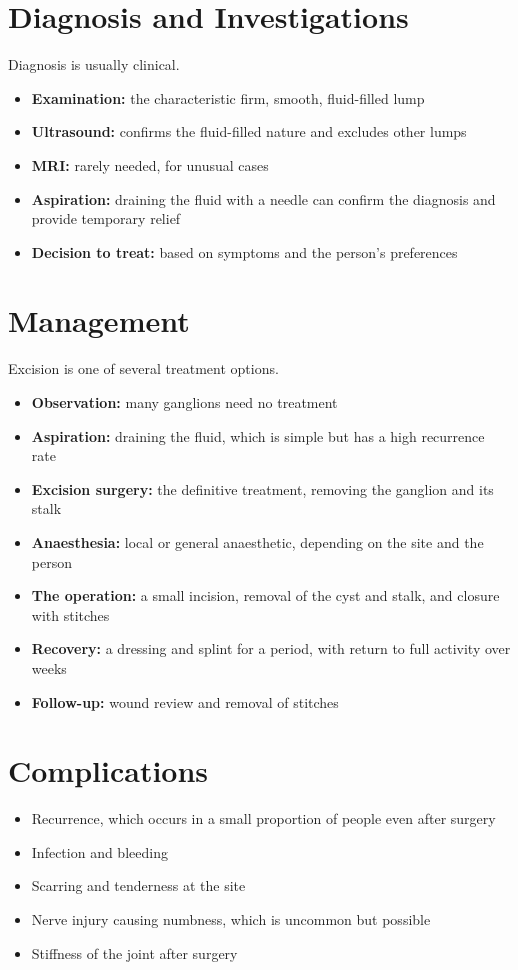 \section*{Diagnosis and Investigations}
Diagnosis is usually clinical.
\begin{itemize}
    \item \textbf{Examination:} the characteristic firm, smooth, fluid-filled lump
    \item \textbf{Ultrasound:} confirms the fluid-filled nature and excludes other lumps
    \item \textbf{MRI:} rarely needed, for unusual cases
    \item \textbf{Aspiration:} draining the fluid with a needle can confirm the diagnosis and provide temporary relief
    \item \textbf{Decision to treat:} based on symptoms and the person's preferences
\end{itemize}

\section*{Management}
Excision is one of several treatment options.
\begin{itemize}
    \item \textbf{Observation:} many ganglions need no treatment
    \item \textbf{Aspiration:} draining the fluid, which is simple but has a high recurrence rate
    \item \textbf{Excision surgery:} the definitive treatment, removing the ganglion and its stalk
    \item \textbf{Anaesthesia:} local or general anaesthetic, depending on the site and the person
    \item \textbf{The operation:} a small incision, removal of the cyst and stalk, and closure with stitches
    \item \textbf{Recovery:} a dressing and splint for a period, with return to full activity over weeks
    \item \textbf{Follow-up:} wound review and removal of stitches
\end{itemize}

\section*{Complications}
\begin{itemize}
    \item Recurrence, which occurs in a small proportion of people even after surgery
    \item Infection and bleeding
    \item Scarring and tenderness at the site
    \item Nerve injury causing numbness, which is uncommon but possible
    \item Stiffness of the joint after surgery
\end{itemize}

